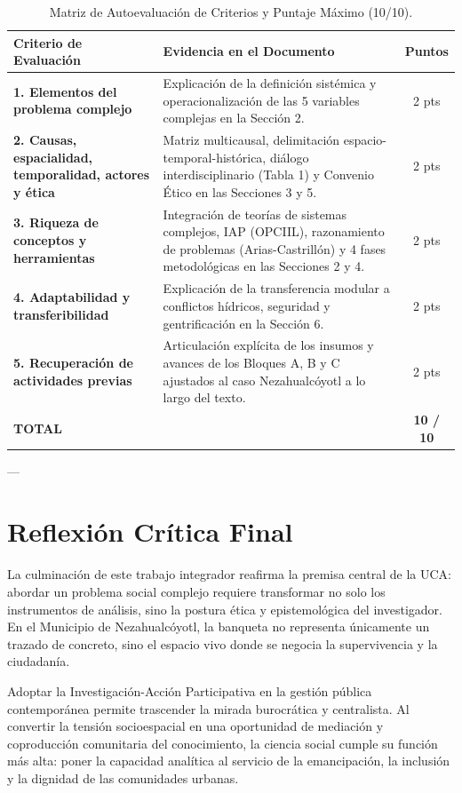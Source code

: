 \documentclass[12pt,a4paper]{article}
\begin{document}
\begin{table}[htbp]
\centering
\small
\caption{Matriz de Autoevaluación de Criterios y Puntaje Máximo (10/10).}
\begin{tabular}{p{4.5cm} p{8.5cm} c}
\toprule
\textbf{Criterio de Evaluación} & \textbf{Evidencia en el Documento} & \textbf{Puntos} \\
\midrule
\textbf{1. Elementos del problema complejo} & Explicación de la definición sistémica y operacionalización de las 5 variables complejas en la Sección 2. & 2 pts \\
\midrule
\textbf{2. Causas, espacialidad, temporalidad, actores y ética} & Matriz multicausal, delimitación espacio-temporal-histórica, diálogo interdisciplinario (Tabla 1) y Convenio Ético en las Secciones 3 y 5. & 2 pts \\
\midrule
\textbf{3. Riqueza de conceptos y herramientas} & Integración de teorías de sistemas complejos, IAP (OPCIIL), razonamiento de problemas (Arias-Castrillón) y 4 fases metodológicas en las Secciones 2 y 4. & 2 pts \\
\midrule
\textbf{4. Adaptabilidad y transferibilidad} & Explicación de la transferencia modular a conflictos hídricos, seguridad y gentrificación en la Sección 6. & 2 pts \\
\midrule
\textbf{5. Recuperación de actividades previas} & Articulación explícita de los insumos y avances de los Bloques A, B y C ajustados al caso Nezahualcóyotl a lo largo del texto. & 2 pts \\
\bottomrule
\textbf{TOTAL} & & \textbf{10 / 10} \\
\bottomrule
\end{tabular}
\end{table}

---

\section{Reflexión Crítica Final}

La culminación de este trabajo integrador reafirma la premisa central de la UCA: abordar un problema social complejo requiere transformar no solo los instrumentos de análisis, sino la postura ética y epistemológica del investigador. En el Municipio de Nezahualcóyotl, la banqueta no representa únicamente un trazado de concreto, sino el espacio vivo donde se negocia la supervivencia y la ciudadanía.

Adoptar la Investigación-Acción Participativa en la gestión pública contemporánea permite trascender la mirada burocrática y centralista. Al convertir la tensión socioespacial en una oportunidad de mediación y coproducción comunitaria del conocimiento, la ciencia social cumple su función más alta: poner la capacidad analítica al servicio de la emancipación, la inclusión y la dignidad de las comunidades urbanas.
\end{document}
